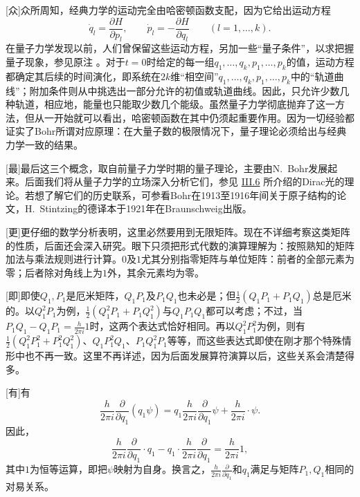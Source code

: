 \documentclass[fontsize=13pt,twoside,openany,headings=normal,parskip=false,bookmarkpackage=false,DIV=calc]{scrbook}
\begin{document}
[众]{众所周知，经典力学的运动完全由哈密顿函数支配，因为它给出运动方程
\[
\dot q_l=\frac{\partial H}{\partial p_l},\qquad
\dot p_l=-\frac{\partial H}{\partial q_l}\qquad(l=1,\ldots,k).
\]\hypertarget{origpage-239}{}\label{origpage-239}在量子力学发现以前，人们曾保留这些运动方程，另加一些“量子条件”，以求把握量子现象，参见原注 \hyperlink{note-6}{}。对于$t=0$时给定的每一组$q_1,\allowbreak \ldots,\allowbreak q_k,\allowbreak p_1,\allowbreak \ldots,\allowbreak p_k$的值，运动方程都确定其后续的时间演化，即系统在$2k$维“相空间”$q_1,\allowbreak \ldots,\allowbreak q_k,\allowbreak p_1,\allowbreak \ldots,\allowbreak p_k$中的“轨道曲线”；附加条件则从中挑选出一部分允许的初值或轨道曲线。因此，只允许少数几种轨道，相应地，能量也只能取少数几个能级。虽然量子力学彻底抛弃了这一方法，但从一开始就可以看出，哈密顿函数在其中仍须起重要作用。因为一切经验都证实了Bohr所谓对应原理：在大量子数的极限情况下，量子理论必须给出与经典力学一致的结果。}

[最]{最后这三个概念，取自前量子力学时期的量子理论，主要由N.~Bohr发展起来。后面我们将从量子力学的立场深入分析它们，参见 \hyperref[sec:III.6]{III.6} 所介绍的Dirac光的理论。若想了解它们的历史联系，可参看Bohr在1913至1916年间关于原子结构的论文，H.~Stintzing的德译本于1921年在Braunschweig出版。}

[更]{更仔细的数学分析表明，这里必然要用到无限矩阵。现在不详细考察这类矩阵的性质，后面还会深入研究。眼下只须把形式代数的演算理解为：按照熟知的矩阵加法与乘法规则进行计算。$0$及$1$尤其分别指零矩阵与单位矩阵：前者的全部元素为零；后者除对角线上为$1$外，其余元素均为零。}

[即]{即使$Q_1,\allowbreak P_1$是厄米矩阵，$Q_1P_1$及$P_1Q_1$也未必是；但$\tfrac12(Q_1P_1+P_1Q_1)$总是厄米的。以$Q_1^2P_1$为例，$\tfrac12(Q_1^2P_1+P_1Q_1^2)$与$Q_1P_1Q_1$都可以考虑；不过，当$P_1Q_1-Q_1P_1=\frac{h}{2\pi i}1$时，这两个表达式恰好相同。再以$Q_1^2P_1^2$为例，则有$\tfrac12(Q_1^2P_1^2+P_1^2Q_1^2)$、$Q_1P_1^2Q_1$、$P_1Q_1^2P_1$等等，而这些表达式即使在刚才那个特殊情形中也不再一致。这里不再详述，因为后面发展算符演算以后，这些关系会清楚得多。}

[有]{有
\[
\frac{h}{2\pi i}\frac{\partial}{\partial q_1}(q_1\psi)
=q_1\frac{h}{2\pi i}\frac{\partial}{\partial q_1}\psi
+\frac{h}{2\pi i}\cdot\psi.
\]
因此，
\[
\frac{h}{2\pi i}\frac{\partial}{\partial q_1}\cdot q_1
-q_1\cdot\frac{h}{2\pi i}\frac{\partial}{\partial q_1}
=\frac{h}{2\pi i}1,
\]
其中$1$为恒等运算，即把$\psi$映射为自身。换言之，$\frac{h}{2\pi i}\frac{\partial}{\partial q_1}$和$q_1$满足与矩阵$P_1,\allowbreak Q_1$相同的对易关系。}
\end{document}
